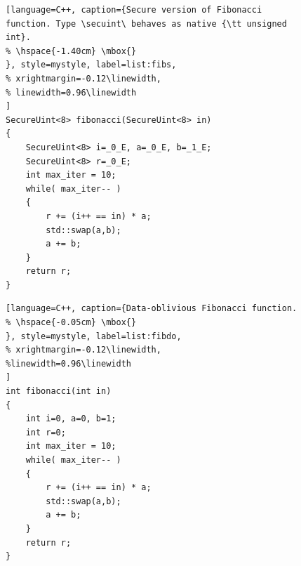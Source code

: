 \begin{figure}
\begin{minipage}{\linewidth}
\begin{lstlisting}[language=C++, caption={Secure version of Fibonacci function. Type \secuint\ behaves as native {\tt unsigned int}.
% \hspace{-1.40cm} \mbox{}
}, style=mystyle, label=list:fibs,
% xrightmargin=-0.12\linewidth,
% linewidth=0.96\linewidth
]
SecureUint<8> fibonacci(SecureUint<8> in)
{
    SecureUint<8> i=_0_E, a=_0_E, b=_1_E;
    SecureUint<8> r=_0_E;
    int max_iter = 10;
    while( max_iter-- )
    {
        r += (i++ == in) * a;
        std::swap(a,b);
        a += b;
    }
    return r;
}
\end{lstlisting}

\vspace{-0.5cm} 


\end{minipage}
\end{figure}

\begin{figure}
\begin{minipage}{\linewidth}
\begin{lstlisting}[language=C++, caption={Data-oblivious Fibonacci function.
% \hspace{-0.05cm} \mbox{}
}, style=mystyle, label=list:fibdo,
% xrightmargin=-0.12\linewidth,
%linewidth=0.96\linewidth
]
int fibonacci(int in)
{
    int i=0, a=0, b=1;
    int r=0;
    int max_iter = 10;
    while( max_iter-- )
    {
        r += (i++ == in) * a;
        std::swap(a,b);
        a += b;
    }
    return r;
}
\end{lstlisting}
\end{minipage}
\vspace{-0.2in}
\end{figure}

